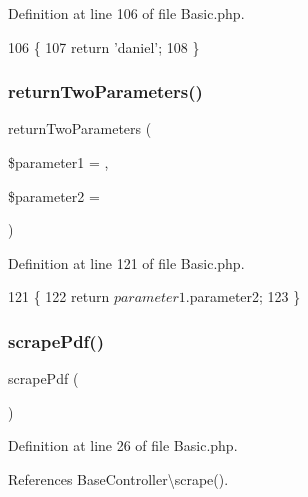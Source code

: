 Definition at line 106 of file Basic.\+php.


\begin{DoxyCode}
106                                    \{
107         \textcolor{keywordflow}{return} \textcolor{stringliteral}{'daniel'};
108     \}
\end{DoxyCode}
\hypertarget{class_basic_a2ef87b96abcca966a41e34d077fcc38e}{}\label{class_basic_a2ef87b96abcca966a41e34d077fcc38e} 
\subsubsection{\texorpdfstring{return\+Two\+Parameters()}{returnTwoParameters()}}
{\footnotesize\ttfamily return\+Two\+Parameters (\begin{DoxyParamCaption}\item[{}]{\$parameter1 = {\ttfamily \textquotesingle{}\textquotesingle{}},  }\item[{}]{\$parameter2 = {\ttfamily \textquotesingle{}\textquotesingle{}} }\end{DoxyParamCaption})}



Definition at line 121 of file Basic.\+php.


\begin{DoxyCode}
121                                                                             \{
122         \textcolor{keywordflow}{return} $parameter1 . $parameter2;
123     \}
\end{DoxyCode}
\hypertarget{class_basic_a67dbb38567401c856d5361d6704874d5}{}\label{class_basic_a67dbb38567401c856d5361d6704874d5} 
\subsubsection{\texorpdfstring{scrape\+Pdf()}{scrapePdf()}}
{\footnotesize\ttfamily scrape\+Pdf (\begin{DoxyParamCaption}{ }\end{DoxyParamCaption})}



Definition at line 26 of file Basic.\+php.



References Base\+Controller\textbackslash{}scrape().


